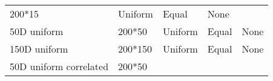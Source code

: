 \documentclass[]{article}
\begin{document}
\begin{longtable}[]{@{}lllll@{}}
\begin{minipage}[t]{0.12333\columnwidth}
200*15\strut
\end{minipage} & \begin{minipage}[t]{0.31\columnwidth}\raggedright\strut
Uniform\strut
\end{minipage} & \begin{minipage}[t]{0.21\columnwidth}\raggedright\strut
Equal\strut
\end{minipage} & \begin{minipage}[t]{0.13\columnwidth}\raggedright\strut
None\strut
\end{minipage}\tabularnewline
\begin{minipage}[t]{0.12\columnwidth}\raggedright\strut
50D uniform\strut
\end{minipage} & \begin{minipage}[t]{0.12333\columnwidth}\raggedright\strut
200*50\strut
\end{minipage} & \begin{minipage}[t]{0.31\columnwidth}\raggedright\strut
Uniform\strut
\end{minipage} & \begin{minipage}[t]{0.21\columnwidth}\raggedright\strut
Equal\strut
\end{minipage} & \begin{minipage}[t]{0.13\columnwidth}\raggedright\strut
None\strut
\end{minipage}\tabularnewline
\begin{minipage}[t]{0.12\columnwidth}\raggedright\strut
150D uniform\strut
\end{minipage} & \begin{minipage}[t]{0.12333\columnwidth}\raggedright\strut
200*150\strut
\end{minipage} & \begin{minipage}[t]{0.31\columnwidth}\raggedright\strut
Uniform\strut
\end{minipage} & \begin{minipage}[t]{0.21\columnwidth}\raggedright\strut
Equal\strut
\end{minipage} & \begin{minipage}[t]{0.13\columnwidth}\raggedright\strut
None\strut
\end{minipage}\tabularnewline
\begin{minipage}[t]{0.12\columnwidth}\raggedright\strut
50D uniform correlated\strut
\end{minipage} & \begin{minipage}[t]{0.12333\columnwidth}\raggedright\strut
200*50\strut
\end{minipage} & \begin{minipage}[t]{0.31\columnwidth}\raggedright\strut

\end{minipage}
\end{longtable}
\end{document}
